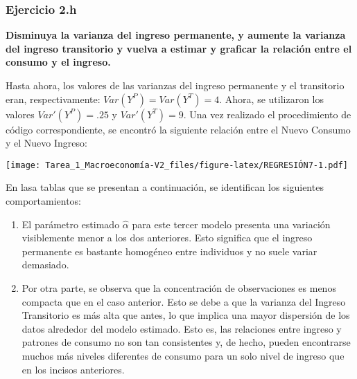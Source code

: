 \documentclass[
]{article}
\begin{document}
\newpage

\hypertarget{ejercicio-2.h}{%
\subsubsection{Ejercicio 2.h}\label{ejercicio-2.h}}

\textbf{Disminuya la varianza del ingreso permanente, y aumente la
varianza del ingreso transitorio y vuelva a estimar y graficar la
relación entre el consumo y el ingreso.}

Hasta ahora, los valores de las varianzas del ingreso permanente y el
transitorio eran, respectivamente: \(Var(Y^P) = Var(Y^T) = 4\). Ahora,
se utilizaron los valores \(Var'(Y^P) = .25\) y \(Var'(Y^T) = 9\). Una
vez realizado el procedimiento de código correspondiente, se encontró la
siguiente relación entre el Nuevo Consumo y el Nuevo Ingreso:

\texttt{[image: Tarea\_1\_Macroeconomía-V2\_files/figure-latex/REGRESIÓN7-1.pdf]}

En lasa tablas que se presentan a continuación, se identifican los
siguientes comportamientos:

\begin{enumerate}
\def\labelenumi{\arabic{enumi}.}
\item
  El parámetro estimado \(\hat{\alpha}\) para este tercer modelo
  presenta una variación visiblemente menor a los dos anteriores. Esto
  significa que el ingreso permanente es bastante homogéneo entre
  individuos y no suele variar demasiado.
\item
  Por otra parte, se observa que la concentración de observaciones es
  menos compacta que en el caso anterior. Esto se debe a que la varianza
  del Ingreso Transitorio es más alta que antes, lo que implica una
  mayor dispersión de los datos alrededor del modelo estimado. Esto es,
  las relaciones entre ingreso y patrones de consumo no son tan
  consistentes y, de hecho, pueden encontrarse muchos más niveles
  diferentes de consumo para un solo nivel de ingreso que en los incisos
  anteriores.
\end{enumerate}
\end{document}
